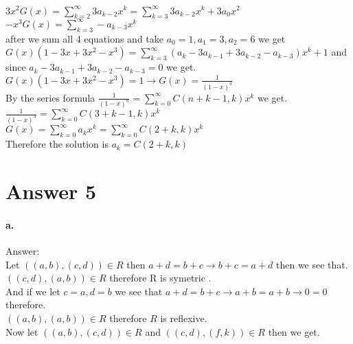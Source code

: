 \documentclass[11pt]{article}
\begin{document}
    $3x^2G(x) = \sum_{k=2}^{\infty} 3a_{k-2}x^k = \sum_{k=3}^{\infty} 3a_{k-2}x^k + 3a_0x^2$\\
    
    $-x^3G(x) = \sum_{k=3}^{\infty} -a_{k-3}x^k$\\
    
    after we sum all 4 equations and take $a_0 = 1, a_1 = 3, a_2 = 6$ we get\\
    
    $G(x)(1-3x+3x^2-x^3) = \sum_{k=3}^{\infty}(a_k - 3a_{k-1} + 3a_{k-2} - a_{k-3})x^k + 1$ and since $a_k - 3a_{k-1} + 3a_{k-2} - a_{k-3} = 0$ we get.\\
    
    $G(x)(1-3x+3x^2-x^3) = 1 \rightarrow G(x) = \frac{1}{(1-x)^3}$\\ 
    
    By the series formula $\frac{1}{(1-x)^n} = \sum_{k=0}^{\infty} C(n+k-1,k)x^k$ we get.\\
    
    $\frac{1}{(1-x)^3} = \sum_{k=0}^{\infty} C(3+k-1,k)x^k$\\
    
    $G(x) = \sum_{k=0}^{\infty} a_kx^k = \sum_{k=0}^{\infty} C(2+k,k)x^k$\\
    
    Therefore the solution is $a_k = C(2+k,k)$
    
    
\section*{Answer 5}
\paragraph{a.}
Answer: \\

    

    Let $((a,b),(c,d)) \in R$ then $a+d = b+c \rightarrow b+c = a+d$ then we see that.\\
    
    $((c,d),(a,b)) \in R$ therefore R is symetric .\\
    
    And if we let $c=a, d=b$ we see that $a+d = b+c \rightarrow a+b = a+b \rightarrow 0 = 0$ therefore.\\
    
    $((a,b),(a,b)) \in R$ therefore $R$ is reflexive.\\
    
    Now let $((a,b),(c,d)) \in R$ and $((c,d),(f,k)) \in R$ then we get.\\
    
\end{document}
